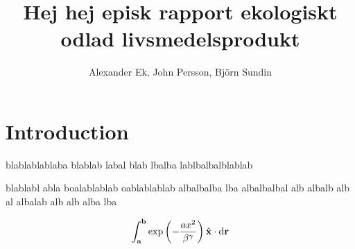 \documentclass[12pt, titlepage, parskip=full*]{scrartcl}
\title{Hej hej episk rapport ekologiskt odlad livsmedelsprodukt}
\author{Alexander Ek, John Persson, Björn Sundin}
\begin{document}
\maketitle

\tableofcontents

\section{Introduction}

blablablablaba blablab labal blab lbalba lablbalbalblablab

blablabl abla boalablablab oablablablab albalbalba lba albalbalbal alb albalb alb al albalab alb alb alba lba

\begin{equation}
	\int_{\vb{a}}^{\vb{b}}\exp\left(-\frac{ax^2}{\beta^\gamma}\right)\hat{\vb{x}} \cdot \differential{\vb{r}}
\end{equation}
\end{document}
